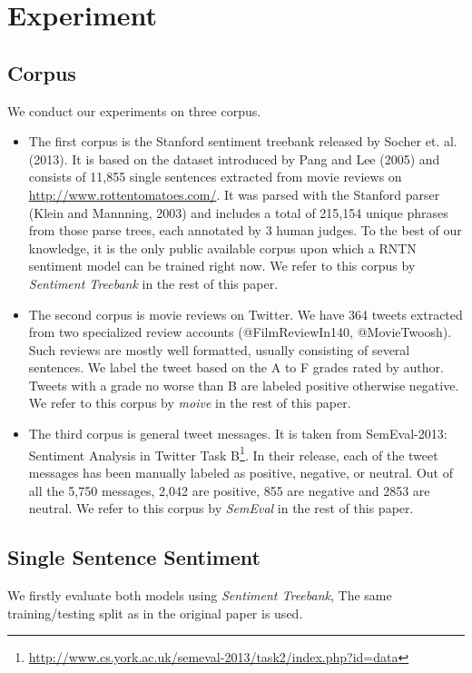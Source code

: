 \section{Experiment}
\label{sec:exp}


\subsection{Corpus}
We conduct our experiments on three corpus.
\begin{itemize}
\item  The first corpus is the Stanford sentiment treebank released by Socher et. al. (2013). It is based on the dataset introduced by Pang and Lee (2005) and consists of 11,855 single sentences extracted from movie reviews on \url{http://www.rottentomatoes.com/}. It was parsed with the Stanford parser (Klein and Mannning, 2003) and includes a total of 215,154 unique phrases from those parse trees, each annotated by 3 human judges. To the best of our knowledge, it is the only public available corpus upon which a RNTN sentiment model can be trained right now. We refer to this corpus by \textit{Sentiment Treebank} in the rest of this paper. 

\item  The second corpus is movie reviews on Twitter. We have 364 tweets extracted from two specialized review accounts (@FilmReviewIn140, @MovieTwoosh). Such reviews are mostly well formatted, usually consisting of several sentences. 
We label the tweet based on the A to F grades rated by author. 
 Tweets with a grade no worse than B are labeled positive otherwise negative.  We refer to this corpus by \textit{moive} in the rest of this paper. 

\item The third corpus is general tweet messages. It is taken from SemEval-2013: Sentiment Analysis in Twitter Task B\footnote{\url{http://www.cs.york.ac.uk/semeval-2013/task2/index.php?id=data}}. In their release, each of the tweet messages has been manually labeled as positive, negative, or neutral. Out of all the 5,750 messages, 2,042 are positive, 855 are negative and 2853 are neutral.  We refer to this corpus by \textit{SemEval} in the rest of this paper. 
\end{itemize}

\subsection{Single Sentence Sentiment}
We firstly evaluate both models using \textit{Sentiment Treebank}, The same training/testing split as in the original paper\cite{Socher:2013} is used. 

